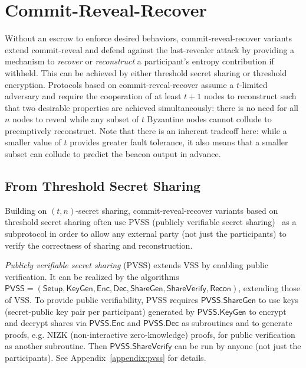 \section{Commit-Reveal-Recover}
\label{section:commit-reveal-recover}
Without an escrow to enforce desired behaviors, commit-reveal-recover variants extend commit-reveal and defend against the last-revealer attack by providing a mechanism to \textit{recover} or \textit{reconstruct} a participant's entropy contribution if withheld. This can be achieved by either threshold secret sharing or threshold encryption. Protocols based on commit-reveal-recover assume a $t$-limited adversary and require the cooperation of at least $t + 1$ nodes to reconstruct such that two desirable properties are achieved simultaneously: there is no need for all $n$ nodes to reveal while any subset of $t$ Byzantine nodes cannot collude to preemptively reconstruct. Note that there is an inherent tradeoff here: while a smaller value of $t$ provides greater fault tolerance, it also means that a smaller subset can collude to predict the beacon output in advance.

\subsection{From Threshold Secret Sharing}
Building on $(t, n)$-secret sharing, commit-reveal-recover variants based on threshold secret sharing often use PVSS (publicly verifiable secret sharing)~\cite{schoenmakers1999simple, cascudo2017scrape} as a subprotocol in order to allow any external party (not just the participants) to verify the correctness of sharing and reconstruction.

\begin{definition}
\textit{Publicly verifiable secret sharing} (PVSS) extends VSS by enabling public verification. It can be realized by the algorithms $\mathsf{PVSS} = (\mathsf{Setup}, \mathsf{KeyGen}, \mathsf{Enc}, \mathsf{Dec}, \mathsf{ShareGen}, \mathsf{ShareVerify}, \mathsf{Recon})$, extending those of VSS. To provide public verifiability, PVSS requires $\mathsf{PVSS.ShareGen}$ to use keys (secret-public key pair per participant) generated by $\mathsf{PVSS.KeyGen}$ to encrypt and decrypt shares via $\mathsf{PVSS.Enc}$ and $\mathsf{PVSS.Dec}$ as subroutines and to generate proofs, e.g. NIZK (non-interactive zero-knowledge) proofs, for public verification as another subroutine. Then $\mathsf{PVSS.ShareVerify}$ can be run by anyone (not just the participants). See Appendix~\ref{appendix:pvss} for details.
\end{definition}

